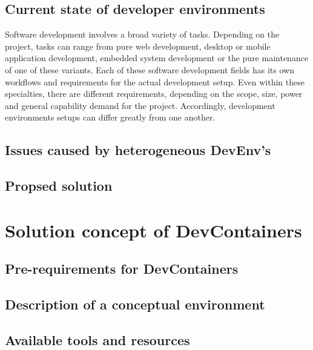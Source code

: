 \documentclass[12pt, a4paper]{article}
\begin{document}
    \subsection{Current state of developer environments}
    Software development involves a broad variety of tasks. Depending on the project, tasks can range from pure web development, desktop or mobile application development, embedded system development or the pure maintenance of one of these variants. Each of these software development fields has its own workflows and requirements for the actual development setup. Even within these specialties, there are different requirements, depending on the scope, size, power and general capability demand for the project. Accordingly, development environments setups can differ greatly from one another.

    \subsection{Issues caused by heterogeneous \acs{DevEnv}'s}
    \subsection{Propsed solution}

\section{Solution concept of DevContainers}\label{sec::solution_concept}
    \subsection{Pre-requirements for DevContainers}
    \subsection{Description of a conceptual environment}
    \subsection{Available tools and resources}
\end{document}
